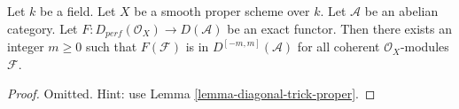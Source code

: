 \begin{lemma}
\label{lemma-boundedness}
Let $k$ be a field. Let $X$ be a smooth proper scheme over $k$.
Let $\mathcal{A}$ be an abelian category. Let
$F : D_{perf}(\mathcal{O}_X) \to D(\mathcal{A})$ be an exact functor.
Then there exists an integer $m \geq 0$ such that
$F(\mathcal{F})$ is in $D^{[-m, m]}(\mathcal{A})$
for all coherent $\mathcal{O}_X$-modules $\mathcal{F}$.
\end{lemma}

\begin{proof}
Omitted. Hint: use Lemma \ref{lemma-diagonal-trick-proper}.
\end{proof}

















